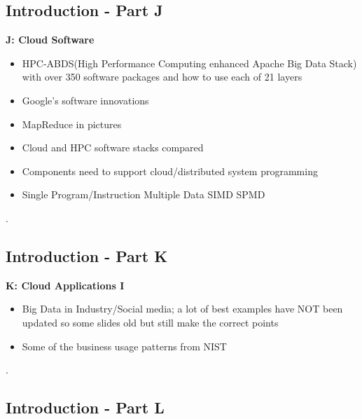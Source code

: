 \subsection{Introduction - Part J}\label{s:cloud-fundamentals-j}

\textbf{J: Cloud Software}
\begin{itemize}
\item HPC-ABDS(High Performance Computing enhanced Apache Big Data Stack) with over 350 software packages and how to use each of 21 layers
\item Google’s software innovations
\item MapReduce in pictures
\item Cloud and HPC software stacks compared
\item Components need to support cloud/distributed system programming
\item Single Program/Instruction Multiple Data SIMD SPMD
\end{itemize}.

\subsection{Introduction - Part K}\label{s:cloud-fundamentals-k}

\textbf{K: Cloud Applications I}
\begin{itemize}
\item Big Data in Industry/Social media; a lot of best examples have NOT been updated so some slides old but still make the correct points
\item Some of the business usage patterns from NIST

\end{itemize}. 

\subsection{Introduction - Part L}\label{s:cloud-fundamentals-l}

